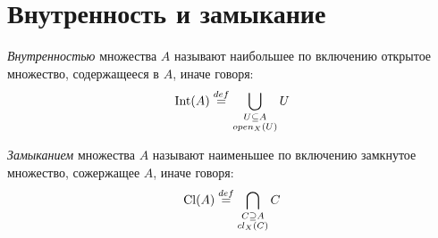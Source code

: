 \section{Внутренность и замыкание}

\begin{definition}
    \textit{Внутренностью} множества $A$ называют наибольшее по включению
    открытое множество, содержащееся в $A$, иначе говоря:
\[
    \operatorname{Int}(A) \overset{def}{\underset{}{=}} \bigcup_{\substack{U \subseteq A \\open_X(U)}}{U}
\]
\end{definition}

\begin{definition}
    \textit{Замыканием} множества $A$ называют наименьшее по включению
    замкнутое множество, сожержащее $A$, иначе говоря:
\[
    \operatorname{Cl}(A) \overset{def}{\underset{}{=}} \bigcap_{\substack{C \supseteq A \\cl_X(C)}}{C}
\]
\end{definition}

